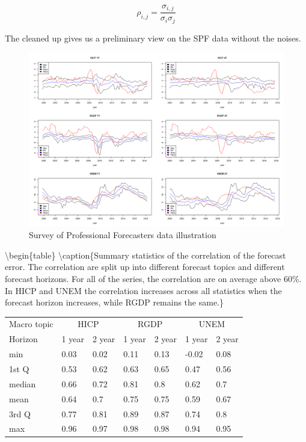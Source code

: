 \documentclass[]{article}
\begin{document}
\begin{equation}
\label{eqn: cov2cor}
\rho_{i,j} = \frac{\sigma_{i,j}}{\sigma_{i}\sigma_{j}}
\end{equation}

The cleaned up gives us a preliminary view on the SPF data without the
noises.

\begin{figure}[!h]
\centering
\includegraphics{./Output/Images/SPF.png}
\caption{Survey of Professional Forecasters data illustration}\label{fig: SPF data illustration}
\end{figure}

\textbackslash{}begin\{table\} \centering
\textbackslash{}caption\{Summary statistics of the correlation of the
forecast error. The correlation are split up into different forecast
topics and different forecast horizons. For all of the series, the
correlation are on average above 60\%. In HICP and UNEM the correlation
increases across all statistics when the forecast horizon increases,
while RGDP remains the same.\}
\label{tab: correlation summary statistics}

\begin{tabular}{lllllll}
\hline
Macro topic & \multicolumn{2}{c}{HICP} & \multicolumn{2}{c}{RGDP} & \multicolumn{2}{c}{UNEM} \\
Horizon     & 1 year & 2 year & 1 year & 2 year & 1 year & 2 year \\ \hline
min         & 0.03        & 0.02        & 0.11        & 0.13        & -0.02        & 0.08       \\
1st Q       & 0.53        & 0.62        & 0.63        & 0.65        & 0.47         & 0.56       \\
median      & 0.66        & 0.72        & 0.81        & 0.8         & 0.62         & 0.7        \\
mean        & 0.64        & 0.7         & 0.75        & 0.75        & 0.59         & 0.67       \\
3rd Q       & 0.77        & 0.81        & 0.89        & 0.87        & 0.74         & 0.8        \\
max         & 0.96        & 0.97        & 0.98        & 0.98        & 0.94         & 0.95       \\ 
\hline
\end{tabular}
\end{document}
